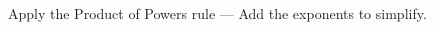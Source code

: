 \documentclass[12pt, a4paper, addpoints]{exam}
\newcommand{\ts}{\vspace{16mm}}
\newcommand{\expandquadratic}[5]{
    \pgfmathsetmacro{\termone}{int(#1*#4)} %
    \pgfmathsetmacro{\termtwo}{int(#1*#5 + #2*#4)} %
    \pgfmathsetmacro{\termthree}{int(#2*#5 + #3*#4)} %
    \pgfmathsetmacro{\termfour}{int(#3*#5)} %
    
    \ifnum\termone=0\else
        \ifnum\termone=1 x^3\else
        \ifnum\termone=-1 -x^3\else \termone x^3\fi\fi
    \fi
    \ifnum\termtwo=0\else
        \ifnum\termtwo>0 
            \ifnum\termtwo=1 + x^2\else + \termtwo x^2\fi
        \else
            \ifnum\termtwo=-1 - x^2\else \termtwo x^2\fi
        \fi
    \fi
    \ifnum\termthree=0\else
        \ifnum\termthree>0 
            \ifnum\termthree=1 + x\else + \termthree x\fi
        \else
            \ifnum\termthree=-1 - x\else \termthree x\fi
        \fi
    \fi
    \ifnum\termfour=0\else
        \ifnum\termfour>0 + \termfour\else \termfour\fi
    \fi
}
\newcommand{\syntheticdiv}[5]{
    \dfrac{
        \expandquadratic{#1}{#2}{#3}{#4}{#5}
    }{
        \ifnum#4=1
            x \pm #5
        \else
            #4x \pm #5
        \fi
    }
}
\begin{document}
\begin{questions}



\large

\question Apply the Product of Powers rule — Add the exponents to simplify.

\setlength{\columnsep}{20pt}
\begin{multicols}{2}
\end{multicols}
\ts





\end{questions}
\end{document}
